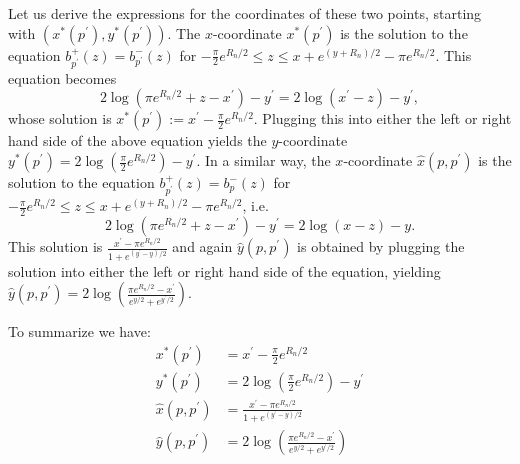 Let us derive the expressions for the coordinates of these two points, starting with $(x^\ast(p^\prime), y^\ast(p^\prime))$. The $x$-coordinate $x^\ast(p^\prime)$ is the solution to the equation $b_{p^\prime}^+(z) = b_{p^\prime}^-(z)$ for $-\frac{\pi}{2} e^{R_n/2} \le z \le x + e^{(y + R_n)/2} - \pi e^{R_n/2}$. This equation becomes
\[
	2\log\left(\pi e^{R_n/2} + z - x^\prime\right) - y^\prime = 2 \log\left(x^\prime-z\right) - y^\prime,
\]
whose solution is $x^\ast(p^\prime) := x^\prime - \frac{\pi}{2} e^{R_n/2}$. Plugging this into either the left or right hand side of the above equation yields the $y$-coordinate $y^\ast(p^\prime) = 2\log\left(\frac{\pi}{2}e^{R_n/2}\right) - y^\prime$. In a similar way, the $x$-coordinate $\hat{x}(p,p^\prime)$ is the solution to the equation $b_{p^\prime}^+(z) = b_{p}^-(z)$ for $-\frac{\pi}{2} e^{R_n/2} \le z \le x + e^{(y + R_n)/2} - \pi e^{R_n/2}$, i.e.
\[
	2\log\left(\pi e^{R_n/2} + z - x^\prime\right) - y^\prime = 2 \log\left(x-z\right) - y.
\] 
This solution is $\frac{x^\prime - \pi e^{R_n/2}}{1 + e^{(y^\prime - y)/2}}$ and again $\hat{y}(p,p^\prime)$ is obtained by plugging the solution into either the left or right hand side of the equation, yielding $\hat{y}(p,p^\prime) = 2 \log\left(\frac{\pi e^{R_n/2} - x^\prime}{e^{y/2} + e^{y^\prime/2}}\right)$.

To summarize we have:
\begin{align*}
	x^\ast(p^\prime) &= x^\prime - \frac{\pi}{2} e^{R_n/2}\\
	y^\ast(p^\prime) &= 2\log\left(\frac{\pi}{2}e^{R_n/2}\right) - y^\prime\\
	\hat{x}(p,p^\prime) &= \frac{x^\prime - \pi e^{R_n/2}}{1 + e^{(y^\prime - y)/2}} \\
	\hat{y}(p,p^\prime) &= 2 \log\left(\frac{\pi e^{R_n/2} - x^\prime}{e^{y/2} + e^{y^\prime/2}}\right)
\end{align*}

